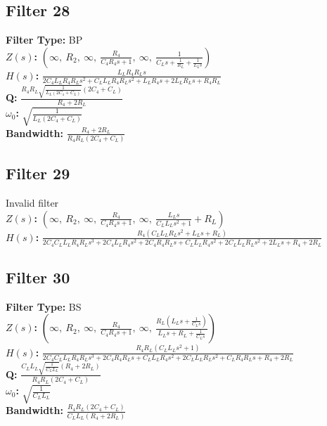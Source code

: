 \documentclass{article}
\begin{document}
\subsection*{Filter 28}
\textbf{Filter Type:} BP \\ 
\textbf{$Z(s)$:} $\left( \infty, \  R_{2}, \  \infty, \  \frac{R_{4}}{C_{4} R_{4} s + 1}, \  \infty, \  \frac{1}{C_{L} s + \frac{1}{R_{L}} + \frac{1}{L_{L} s}}\right)$ \\ 
\textbf{$H(s)$:} $\frac{L_{L} R_{4} R_{L} s}{2 C_{4} L_{L} R_{4} R_{L} s^{2} + C_{L} L_{L} R_{4} R_{L} s^{2} + L_{L} R_{4} s + 2 L_{L} R_{L} s + R_{4} R_{L}}$ \\ 
\textbf{Q:} $\frac{R_{4} R_{L} \sqrt{\frac{1}{L_{L} \left(2 C_{4} + C_{L}\right)}} \left(2 C_{4} + C_{L}\right)}{R_{4} + 2 R_{L}}$ \\ 
\textbf{$\omega_0$:} $\sqrt{\frac{1}{L_{L} \left(2 C_{4} + C_{L}\right)}}$ \\ 
\textbf{Bandwidth:} $\frac{R_{4} + 2 R_{L}}{R_{4} R_{L} \left(2 C_{4} + C_{L}\right)}$ \\ 
\subsection*{Filter 29}
Invalid filter \\ 
\textbf{$Z(s)$:} $\left( \infty, \  R_{2}, \  \infty, \  \frac{R_{4}}{C_{4} R_{4} s + 1}, \  \infty, \  \frac{L_{L} s}{C_{L} L_{L} s^{2} + 1} + R_{L}\right)$ \\ 
\textbf{$H(s)$:} $\frac{R_{4} \left(C_{L} L_{L} R_{L} s^{2} + L_{L} s + R_{L}\right)}{2 C_{4} C_{L} L_{L} R_{4} R_{L} s^{3} + 2 C_{4} L_{L} R_{4} s^{2} + 2 C_{4} R_{4} R_{L} s + C_{L} L_{L} R_{4} s^{2} + 2 C_{L} L_{L} R_{L} s^{2} + 2 L_{L} s + R_{4} + 2 R_{L}}$ \\ 
\subsection*{Filter 30}
\textbf{Filter Type:} BS \\ 
\textbf{$Z(s)$:} $\left( \infty, \  R_{2}, \  \infty, \  \frac{R_{4}}{C_{4} R_{4} s + 1}, \  \infty, \  \frac{R_{L} \left(L_{L} s + \frac{1}{C_{L} s}\right)}{L_{L} s + R_{L} + \frac{1}{C_{L} s}}\right)$ \\ 
\textbf{$H(s)$:} $\frac{R_{4} R_{L} \left(C_{L} L_{L} s^{2} + 1\right)}{2 C_{4} C_{L} L_{L} R_{4} R_{L} s^{3} + 2 C_{4} R_{4} R_{L} s + C_{L} L_{L} R_{4} s^{2} + 2 C_{L} L_{L} R_{L} s^{2} + C_{L} R_{4} R_{L} s + R_{4} + 2 R_{L}}$ \\ 
\textbf{Q:} $\frac{C_{L} L_{L} \sqrt{\frac{1}{C_{L} L_{L}}} \left(R_{4} + 2 R_{L}\right)}{R_{4} R_{L} \left(2 C_{4} + C_{L}\right)}$ \\ 
\textbf{$\omega_0$:} $\sqrt{\frac{1}{C_{L} L_{L}}}$ \\ 
\textbf{Bandwidth:} $\frac{R_{4} R_{L} \left(2 C_{4} + C_{L}\right)}{C_{L} L_{L} \left(R_{4} + 2 R_{L}\right)}$ \\ 
\end{document}

